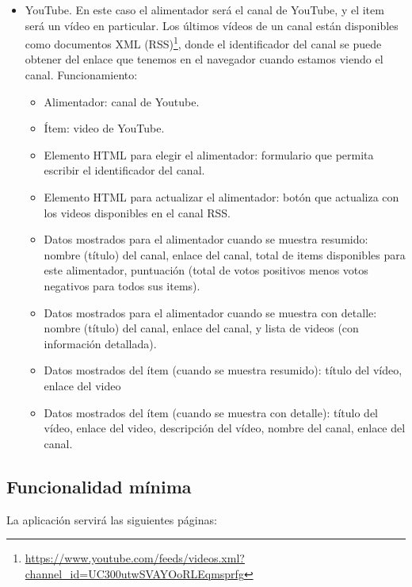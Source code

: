 \begin{itemize}
\item YouTube. En este caso el alimentador será el canal de YouTube, y el item será un vídeo en particular. Los últimos vídeos de un canal están disponibles como documentos XML (RSS)\footnote{\url{https://www.youtube.com/feeds/videos.xml?channel_id=UC300utwSVAYOoRLEqmsprfg}}, donde el identificador del canal se puede obtener del enlace que tenemos en el navegador cuando estamos viendo el canal. Funcionamiento:
  \begin{itemize}
  \item Alimentador: canal de Youtube.
  \item Ítem: video de YouTube.
  \item Elemento HTML para elegir el alimentador: formulario que permita escribir el identificador del canal.
  \item Elemento HTML para actualizar el alimentador: botón que actualiza con los videos disponibles en el canal RSS.
  \item Datos mostrados para el alimentador cuando se muestra resumido: nombre (título) del canal, enlace del canal, total de items disponibles para este alimentador, puntuación (total de votos positivos menos votos negativos para todos sus items).
  \item Datos mostrados para el alimentador cuando se muestra con detalle: nombre (título) del canal, enlace del canal, y lista de videos (con información detallada).
  \item Datos mostrados del ítem (cuando se muestra resumido): título del vídeo, enlace del video
  \item Datos mostrados del ítem (cuando se muestra con detalle): título del vídeo, enlace del video, descripción del vídeo, nombre del canal, enlace del canal.
  \end{itemize}
\end{itemize}
\subsection{Funcionalidad mínima}

La aplicación servirá las siguientes páginas:

